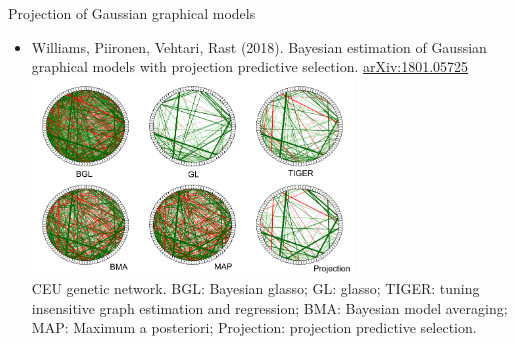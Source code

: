 \documentclass[english,t]{beamer}
\begin{document}
\begin{frame}
  
  {\Large\color{navyblue} Projection of Gaussian graphical models}\\

  \begin{itemize}
  \item Williams, Piironen, Vehtari, Rast (2018). Bayesian estimation of Gaussian graphical models with projection predictive selection. \href{https://arxiv.org/abs/1801.05725}{arXiv:1801.05725}\\
    \includegraphics[width=8.5cm]{ceu.pdf}\\
    {\footnotesize CEU genetic network. BGL: Bayesian glasso; GL: glasso;
      TIGER: tuning insensitive graph estimation and regression; BMA:
      Bayesian model averaging; MAP: Maximum a posteriori; Projection:
      projection predictive selection.}
  \end{itemize}
  
\end{frame}
\end{document}
